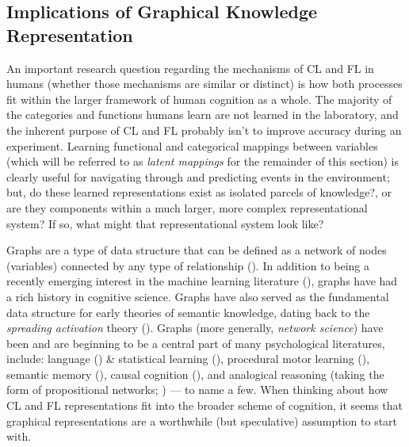 \documentclass[12pt]{article}
\let\oldcite=\cite
\renewcommand{\cite}[1]{\textcolor[rgb]{0, .121, .388}{\oldcite{#1}}}
\begin{document}
\subsection{Implications of Graphical Knowledge Representation} \label{graphs}

An important research question regarding the mechanisms of CL and FL in humans (whether those mechanisms are similar or distinct) is how both processes fit within the larger framework of human cognition as a whole. The majority of the categories and functions humans learn are not learned in the laboratory, and the inherent purpose of CL and FL probably isn't to improve accuracy during an experiment. Learning functional and categorical mappings between variables (which will be referred to as \emph{latent mappings} for the remainder of this section) is clearly useful for navigating through and predicting events in the environment; but, do these learned representations exist as isolated parcels of knowledge?, or are they components within a much larger, more complex representational system? If so, what might that representational system look like?

Graphs are a type of data structure that can be defined as a network of nodes (variables) connected by any type of relationship (\cite{newman2003structure}). In addition to being a recently emerging interest in the machine learning literature (\cite{wu2020inference,bronstein2017geometric,schlichtkrull2018modeling}), graphs have had a rich history in cognitive science. Graphs have also served as the fundamental data structure for early theories of semantic knowledge, dating back to the \emph{spreading activation} theory (\cite{quillian1967word,collins1969retrieval,collins1975spreading}). Graphs (more generally, \emph{network science}) have been and are beginning to be a central part of many psychological literatures, include: language (\cite{vitevitch2008can}) \& statistical learning (\cite{saffran1996word,lynn2019graph}), procedural motor learning (\cite{kahn2018network}), semantic memory (\cite{abbott2012human}), causal cognition (\cite{danks2014unifying}), and analogical reasoning (taking the form of propositional networks; \cite{gentner1983structure}) --- to name a few. When thinking about how CL and FL representations fit into the broader scheme of cognition, it seems that graphical representations are a worthwhile (but speculative) assumption to start with.
\end{document}
